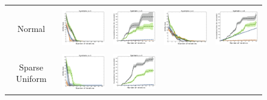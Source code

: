 \documentclass{article}
\renewcommand\[{\begin{equation}}
\renewcommand\]{\end{equation}}
\begin{document}
\begin{figure}[t]
{\begin{tabular}{ccccc}
        \\
        \hline
        \\
         {\sc Normal} &
        \includegraphics[align=c,width=10em]{figures/synthetic_vs_others_3_normal_per_iter_loss} &
        \includegraphics[align=c,width=10em]{figures/synthetic_vs_others_3_normal_per_iter_time} &
        \includegraphics[align=c,width=10em]{figures/synthetic_vs_others_4_normal_per_iter_loss} &
        \includegraphics[align=c,width=10em]{figures/synthetic_vs_others_4_normal_per_iter_time}
        \\
        \hline
        \\
        {\sc Sparse Uniform} &
        \includegraphics[align=c,width=10em]{figures/synthetic_vs_others_3_uniform_sparse_per_iter_loss} &
        \includegraphics[align=c,width=10em]{figures/synthetic_vs_others_3_uniform_sparse_per_iter_time} &

\end{tabular}}
\end{figure}
\end{document}
